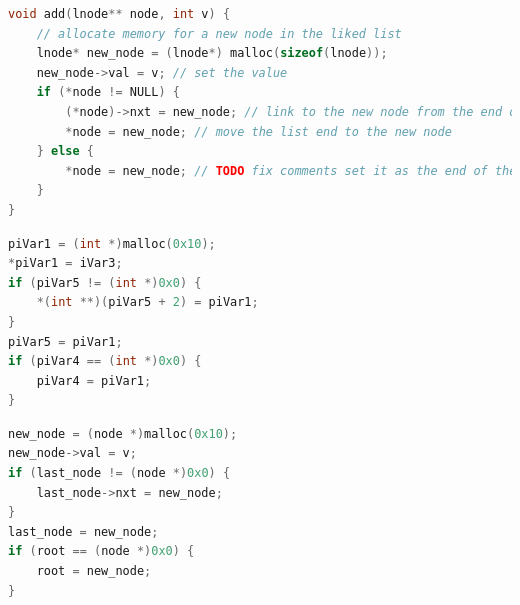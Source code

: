 

\begin{lstlisting}[language=c, label={code:decompilation-original}, caption={A function which adds an integer value \cc{v} to the end of a linked list.}]
void add(lnode** node, int v) {
    // allocate memory for a new node in the liked list
    lnode* new_node = (lnode*) malloc(sizeof(lnode));
    new_node->val = v; // set the value
    if (*node != NULL) {
        (*node)->nxt = new_node; // link to the new node from the end of the list
        *node = new_node; // move the list end to the new node
    } else {
        *node = new_node; // TODO fix comments set it as the end of the list, it it is the first one
    }
}
\end{lstlisting}

\begin{center}

\begin{minipage}[5]{0.45\textwidth}
\begin{lstlisting}[language=c, label={code:decompilation-1}, caption={Ghidra decompilation of the code presented in Listing \ref{code:decompilation-original}. The decompilation is take as-is and has not modified in any way.}]
piVar1 = (int *)malloc(0x10);
*piVar1 = iVar3;
if (piVar5 != (int *)0x0) {
    *(int **)(piVar5 + 2) = piVar1;
}
piVar5 = piVar1;
if (piVar4 == (int *)0x0) {
    piVar4 = piVar1;
}
\end{lstlisting}
\end{minipage}
\hspace{1.3cm}
\begin{minipage}[5]{0.45\textwidth}
\begin{lstlisting}[language=c, label={code:decompilation-2}, caption={Ghidra decompilation of the code presented in Listing \ref{code:decompilation-original}. The decompilation has been modified by renaming variabled and changing data types, based on educated guesses.}]
new_node = (node *)malloc(0x10);
new_node->val = v;
if (last_node != (node *)0x0) {
    last_node->nxt = new_node;
}
last_node = new_node;
if (root == (node *)0x0) {
    root = new_node;
}
\end{lstlisting}
\end{minipage}

\end{center}

